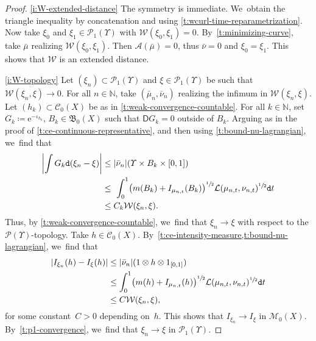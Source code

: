 \documentclass[10pt]{amsart}
\theoremstyle{definition}
\theoremstyle{remark}
\DeclarePairedDelimiter{\paren}{\lparen}{\rparen}
\DeclarePairedDelimiter{\abs}{\lvert}{\rvert}
\begin{document}
\skpt
\begin{proof}
\cref{i:W-extended-distance} The symmetry is immediate. We~obtain the triangle inequality by concatenation and using \cref{t:wcurl-time-reparametrization}.
Now take $\xi_{0}$ and $\xi_{1} \in \mathscr{P}_{1}(\varUpsilon)$ with $\mathcal{W}(\xi_{0}, \xi_{1}) = 0$.
By~\cref{t:minimizing-curve}, take $\bar{\mu}$ realizing $\mathcal{W}(\xi_{0}, \xi_{1})$.
Then $\mathcal{A}(\bar{\mu}) = 0$, thus $\bar{\nu} =0$ and $\xi_{0} = \xi_{1}$.
This shows that $\mathcal{W}$ is an extended distance.

\cref{i:W-topology}
Let $(\xi_{n}) \subset \mathscr{P}_{1}(\varUpsilon)$ and $\xi \in \mathscr{P}_{1}(\varUpsilon)$ be such that $\mathcal{W}(\xi_{n}, \xi) \to 0$.
For all $n \in \mathbb{N}$, take $(\bar{\mu}_{n}, \bar{\nu}_{n})$ realizing the infimum in $\mathcal{W}(\xi_{n}, \xi)$.
Let $(h_{k}) \subset \mathscr{C}_{0}(X)$ be as in \cref{t:weak-convergence-countable}.
For all $k \in \mathbb{N}$, set $G_{k} \coloneq \mathrm{e}^{-\iota_{h_{k}}}$, $B_{k} \in \mathfrak{B}_{0}(X)$ such that $\mathsf{D} G_{k} = 0$ outside of $B_{k}$.
Arguing as in the proof of \cref{t:ce-continuous-representative}, and then using \cref{t:bound-nu-lagrangian}, we~find that
\begin{equation*}
\begin{split}
\abs*{ \int G_{k} \mathtt{d} (\xi_{n} - \xi) } & \leq \abs{\bar{\nu}_{n}}(\varUpsilon \times B_{k} \times [0,1]) \\
& \leq \ \int_{0}^{1} \paren*{m(B_{k}) + I_{\mu_{n,t}}(B_{k})}^{\sfrac{1}{2}} \mathcal{L}\paren{\mu_{n,t}, \nu_{n,t}}^{\sfrac{1}{2}} \mathtt{d} t \\
& \leq C_{k} \mathcal{W}(\xi_{n}, \xi).
\end{split}
\end{equation*}
Thus, by \cref{t:weak-convergence-countable}, we~find that $\xi_{n} \to \xi$ with respect to the $\mathscr{P}(\varUpsilon)$-topology.
Take $h \in \mathscr{C}_{0}(X)$.
By~\cref{t:ce-intensity-measure,t:bound-nu-lagrangian}, we~find that
\begin{equation*}
\begin{split}
\abs*{ I_{\xi_{n}}(h) - I_{\xi}(h) } & \leq \abs{ \bar{\nu}_{n} }(1 \otimes h \otimes 1_{[0,1]}) \\
& \leq \int_{0}^{1} \paren*{m(h) + I_{\mu_{n,t}}(h)}^{\sfrac{1}{2}} \mathcal{L}\paren{\mu_{n,t}, \nu_{n,t}}^{\sfrac{1}{2}} \mathtt{d} t \\
& \leq C \mathcal{W}(\xi_{n}, \xi),
\end{split}
\end{equation*}
for some constant~$C>0$ depending on~$h$.
This shows that $I_{\xi_{n}} \to I_{\xi}$ in $\mathscr{M}_{0}(X)$.
By~\cref{t:p1-convergence}, we~find that $\xi_{n} \to \xi$ in $\mathscr{P}_{1}(\varUpsilon)$.


\end{proof}
\end{document}
